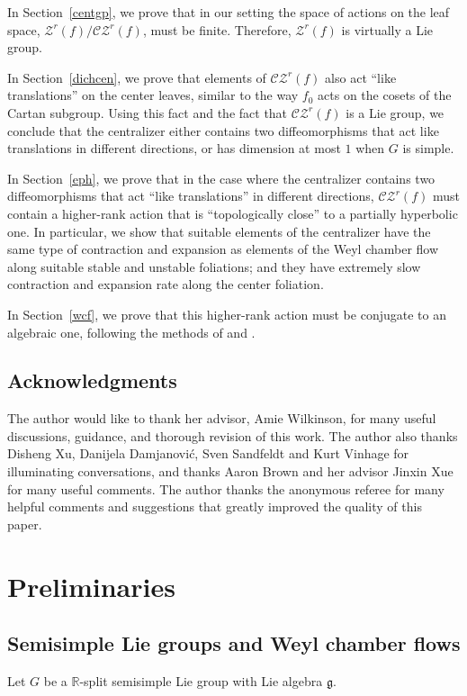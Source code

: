 \documentclass[11pt]{amsart}
\numberwithin{equation}{section}
\newcommand{\R}{\mathbb{R}}
\newcommand{\CZ}{\mathcal{CZ}}
\theoremstyle{plain}
\begin{document}
In Section~\ref{centgp}, we prove that in our setting the space of actions on the leaf space, $\mathcal{Z}^r(f)/\CZ^r(f)$, must be finite. Therefore, $\mathcal{Z}^r(f)$ is virtually a Lie group.

In Section~\ref{dichcen}, we prove that elements of $\CZ^r(f)$ also act ``like translations'' on the center leaves, similar to the way $f_0$ acts on the cosets of the Cartan subgroup. Using this fact and the fact that $\CZ^r(f)$ is a Lie group, we conclude that the centralizer either contains two diffeomorphisms that act like translations in different directions, or has dimension at most $1$ when $G$ is simple.

In Section~\ref{eph}, we prove that in the case where the centralizer contains two diffeomorphisms that act ``like translations'' in different directions, $\CZ^r(f)$ must contain a higher-rank action that is ``topologically close'' to a partially hyperbolic one. In particular, we show that suitable elements of the centralizer have the same type of contraction and expansion as elements of the Weyl chamber flow along suitable stable and unstable foliations; and they have extremely slow contraction and expansion rate along the center foliation.

In Section~\ref{wcf}, we prove that this higher-rank action must be conjugate to an algebraic one, following the methods of \cite{DK} and \cite{VinWang}.

\subsection{Acknowledgments}

The author would like to thank her advisor, Amie Wilkinson, for many useful discussions, guidance, and thorough revision of this work. The author also thanks Disheng Xu, Danijela Damjanović, Sven Sandfeldt and Kurt Vinhage for illuminating conversations, and thanks Aaron Brown and her advisor Jinxin Xue for many useful comments. The author thanks the anonymous referee for many helpful comments and suggestions that greatly improved the quality of this paper.

\section{Preliminaries}\label{prelim}

\subsection{Semisimple Lie groups and Weyl chamber flows}\label{semisimple}
Let $G$ be a $\R$-split semisimple Lie group with Lie algebra $\mathfrak{g}$. 
\end{document}
